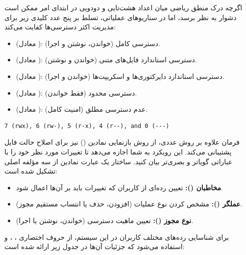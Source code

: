 اگرچه درک منطق ریاضی میان اعداد هشت‌تایی و دودویی در ابتدای امر ممکن است دشوار به نظر برسد، اما در سناریوهای عملیاتی، تسلط بر پنج عدد کلیدی زیر برای مدیریت اکثر دسترسی‌ها کفایت می‌کند:

\begin{itemize}
  \item {} (معادل ): دسترسی کامل (خواندن، نوشتن و اجرا).
  \item {} (معادل ): دسترسی استاندارد فایل‌های متنی (خواندن و نوشتن).
  \item {} (معادل ): دسترسی استاندارد دایرکتوری‌ها و اسکریپت‌ها (خواندن و اجرا).
  \item {} (معادل ): دسترسی محدود (فقط خواندن).
  \item {} (معادل \cmd{---}): عدم دسترسی مطلق (امنیت کامل).
\end{itemize}

\begin{latin}
\begin{lstlisting}
7 (rwx), 6 (rw-), 5 (r-x), 4 (r--), and 0 (---)
\end{lstlisting}
\end{latin}

فرمان  علاوه بر روش عددی، از روش بازنمایی نمادین () نیز برای اصلاح حالت فایل پشتیبانی می‌کند. این رویکرد به شما اجازه می‌دهد تا تغییرات مورد نظر خود را با عباراتی گویاتر و بصری‌تر بیان کنید. ساختار یک عبارت نمادین از سه مؤلفه اصلی تشکیل شده است:

\begin{itemize}
  \item \textbf{مخاطبان ():} تعیین رده‌ای از کاربران که تغییرات باید بر آن‌ها اعمال شود.
  \item \textbf{عملگر ():} مشخص کردن نوع عملیات (افزودن، حذف یا انتساب مستقیم مجوز).
  \item \textbf{نوع مجوز ():} تعیین ماهیت دسترسی (خواندن، نوشتن یا اجرا).
\end{itemize}

برای شناسایی رده‌های مختلف کاربران در این سیستم، از حروف اختصاری ، ،  و  استفاده می‌شود که جزئیات آن‌ها در جدول زیر ارائه شده است:

